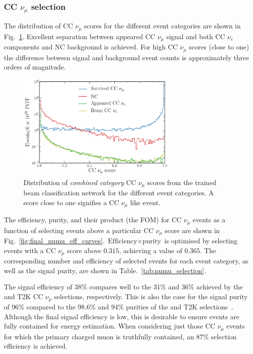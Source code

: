 \subsubsection*{CC $\nu_{\mu}$ selection} %

The distribution of CC $\nu_{\mu}$ scores for the different event categories are shown in
Fig.~\ref{fig:final_beam_numu_outputs}. Excellent separation between appeared CC $\nu_{\mu}$
signal and both CC $\nu_{e}$ components and NC background is achieved. For high CC $\nu_{\mu}$
scores (close to one) the difference between signal and background event counts is approximately
three orders of magnitude.

\begin{figure} %
    \includegraphics[width=0.7\textwidth]{diagrams/7-results/final_beam_numu_outputs.pdf}
    \caption[Distribution of CC $\nu_{\mu}$ scores from the trained beam classification network]
    {Distribution of \emph{combined category} CC $\nu_{\mu}$ scores from the trained beam
        classification network for the different event categories. A score close to one signifies
        a CC $\nu_{\mu}$ like event.}
    \label{fig:final_beam_numu_outputs}
\end{figure}

The efficiency, purity, and their product (the FOM) for CC $\nu_{\mu}$ events as a function of
selecting events above a particular CC $\nu_{\mu}$ score are shown in
Fig.~\ref{fig:final_numu_eff_curves}. $\text{Efficiency}\times\text{purity}$ is optimised by
selecting events with a CC $\nu_{\mu}$ score above $0.315$, achieving a value of $0.365$. The
corresponding number and efficiency of selected events for each event category, as well as the
signal purity, are shown in Table.~\ref{tab:numu_selection}. 

The signal efficiency of 38\% compares well to the 31\% and 36\% achieved by the \nova and T2K CC
$\nu_{\mu}$ selections, respectively. This is also the case for the signal purity of 96\% compared
to the 98.6\% and 94\% purities of the \nova and T2K selections~\cite{acero2019, abe2015}.
Although the final signal efficiency is low, this is desirable to ensure events are fully
contained for energy estimation. When considering just those CC $\nu_{\mu}$ events for which the
primary charged muon is truthfully contained, an 87\% selection efficiency is achieved.

